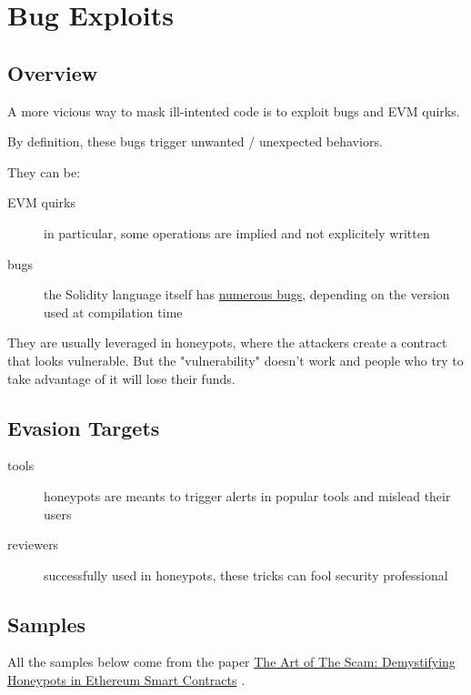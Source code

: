 \section{Bug Exploits}

\subsection{Overview}

A more vicious way to mask ill-intented code is to exploit bugs and EVM quirks.

By definition, these bugs trigger unwanted / unexpected behaviors.

They can be:

\begin{description}
\item[EVM quirks]{in particular, some operations are implied and not explicitely written}
\item[bugs]{the Solidity language itself has \href{https://github.com/ethereum/solidity/blob/develop/docs/bugs.json}{numerous bugs}, depending on the version used at compilation time \cite{changelog-solidity-bugs}}
\end{description}

They are usually leveraged in honeypots, where the attackers create a contract that looks vulnerable.
But the "vulnerability" doesn't work and people who try to take advantage of it will lose their funds.

\subsection{Evasion Targets}

\begin{description}
\item[tools]{honeypots are meants to trigger alerts in popular tools and mislead their users}
\item[reviewers]{successfully used in honeypots, these tricks can fool security professional}
\end{description}

\subsection{Samples}

All the samples below come from the paper \href{https://arxiv.org/pdf/1902.06976.pdf}{The Art of The Scam: Demystifying Honeypots in Ethereum Smart Contracts} \cite{paper-art-of-the-scam}.

